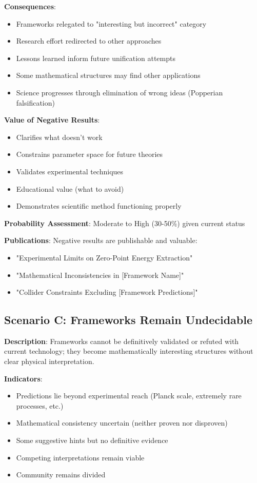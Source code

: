 \textbf{Consequences}:
\begin{itemize}
    \item Frameworks relegated to "interesting but incorrect" category
    \item Research effort redirected to other approaches
    \item Lessons learned inform future unification attempts
    \item Some mathematical structures may find other applications
    \item Science progresses through elimination of wrong ideas (Popperian falsification)
\end{itemize}

\textbf{Value of Negative Results}:
\begin{itemize}
    \item Clarifies what doesn't work
    \item Constrains parameter space for future theories
    \item Validates experimental techniques
    \item Educational value (what to avoid)
    \item Demonstrates scientific method functioning properly
\end{itemize}

\textbf{Probability Assessment}: Moderate to High (30-50\%) given current status

\textbf{Publications}:
Negative results are publishable and valuable:
\begin{itemize}
    \item "Experimental Limits on Zero-Point Energy Extraction"
    \item "Mathematical Inconsistencies in [Framework Name]"
    \item "Collider Constraints Excluding [Framework Predictions]"
\end{itemize}

\subsection{Scenario C: Frameworks Remain Undecidable}

\textbf{Description}: Frameworks cannot be definitively validated or refuted with current technology; they become mathematically interesting structures without clear physical interpretation.

\textbf{Indicators}:
\begin{itemize}
    \item Predictions lie beyond experimental reach (Planck scale, extremely rare processes, etc.)
    \item Mathematical consistency uncertain (neither proven nor disproven)
    \item Some suggestive hints but no definitive evidence
    \item Competing interpretations remain viable
    \item Community remains divided
\end{itemize}

